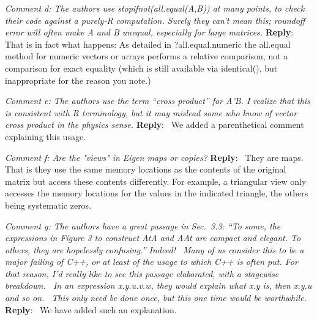 \documentclass[10pt]{article}
\newcommand{\pointRaised}[2]{\smallskip %
  \textsl{{\fontseries{b}\selectfont #1}: #2}\newline}
\newcommand{\reply}[1]{\textbf{Reply}:\ #1 \smallskip } %
\begin{document}
\pointRaised{Comment d}{
  The authors use stopifnot(all.equal(A,B)) at many points, to check
  their code against a purely-R computation. Surely they can't mean this;
  roundoff error will often make A and B unequal, especially for large
  matrices.
}
\reply{
  That is in fact what happens: As detailed in ?all.equal.numeric the
  all.equal method for numeric vectors or arrays performs a relative
  comparison, not a comparison for exact equality (which is still available
  via identical(), but inappropriate for the reason you note.)
}


\pointRaised{Comment e}{
  The authors use the term ``cross product'' for A'B. I realize that
  this is consistent with R terminology, but it may mislead some who know
  of vector cross product in the physics sense.
}
\reply{
  We added a parenthetical comment explaining this usage.
}


\pointRaised{Comment f}{
  Are the "views" in Eigen maps or copies?
}
\reply{
  They are maps.  That is they use the same memory locations as the
  contents of the original matrix but access these contents
  differently.  For example, a triangular view only accesses the
  memory locations for the values in the indicated triangle, the
  others being systematic zeros.
}

\pointRaised{Comment g}{
  The authors have a great passage in Sec.~3.3:
  ``To some, the expressions in Figure 3 to construct AtA and AAt are
  compact and elegant. To others, they are hopelessly confusing.''
  Indeed!  Many of us consider this to be a major failing of C++, or at
  least of the usage to which C++ is often put.
  For that reason, I'd really like to see this passage elaborated, with a
  stagewise breakdown.  In an expression x.y.u.v.w, they would explain
  what x.y is, then x.y.u and so on.  This only need be done once, but
  this one time would be worthwhile.
}
\reply{
  We have added such an explanation.
}
\end{document}
